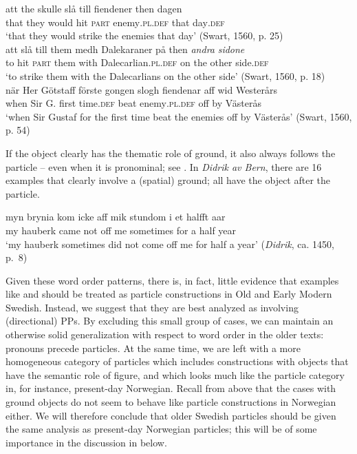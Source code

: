 \documentclass[output=paper]{langscibook}
\begin{document}
\ea\label{ex:lalu:26}
\ea\label{ex:lalu:26a}
\gll  att   the     skulle   slå   till   fiendener         then   dagen\\
    that   they   would   hit  \textsc{part}   enemy\textsc{.pl.def}   that   day\textsc{.def} \\
\glt `that they would strike the enemies that day’ (Swart, 1560, p. 25)\\

\ex\label{ex:lalu:26b}
\gll  att   slå   till   them   medh   Dalekaraner       på   then \textit{andra}   \textit{sidone}\\
    to     hit  \textsc{part}  them   with     Dalecarlian\textsc{.pl.def}   on   the other     side.\textsc{def}\\
\glt `to strike them with the Dalecarlians on the other side’ (Swart, 1560, p. 18)\\
\z
\ex\label{ex:lalu:27}
\gll  när    Her  Götstaff   förste    gongen   slogh   fiendenar aff   wid  Westerårs\\
when   Sir  G.       first     time.\textsc{def}   beat     enemy\textsc{.pl.def}  off   by   Västerås\\
\glt `when Sir Gustaf for the first time beat the enemies off by Västerås' (Swart, 1560, p. 54)\\
\z

If the object clearly has the thematic role of ground, it also always follows the particle – even when it is pronominal; see . In \textit{Didrik av Bern}, there are 16 examples that clearly involve a (spatial) ground; all have the object after the particle.


\ea\label{ex:lalu:28}
\gll  myn   brynia   kom   icke   aff   mik   stundom   i     et   halfft  aar\\
my     hauberk     came  not     off   me   sometimes   for   a   half   year \\
\glt `my hauberk sometimes did not come off me for half a year’ (\textit{Didrik}, ca. 1450, p.~8)\\
\z

Given these word order patterns, there is, in fact, little evidence that examples like  and  should be treated as particle constructions in Old and Early Modern Swedish. Instead, we suggest that they are best analyzed as involving (directional) PPs. By excluding this small group of cases, we can maintain an otherwise solid generalization with respect to word order in the older texts: pronouns precede particles. At the same time, we are left with a more homogeneous category of particles which includes constructions with objects that have the semantic role of figure, and which looks much like the particle category in, for instance, present-day Norwegian. Recall from  above that the cases with ground objects do not seem to behave like particle constructions in Norwegian either. We will therefore conclude that older Swedish particles should be given the same analysis as present-day Norwegian particles; this will be of some importance in the discussion in  below.
\end{document}
